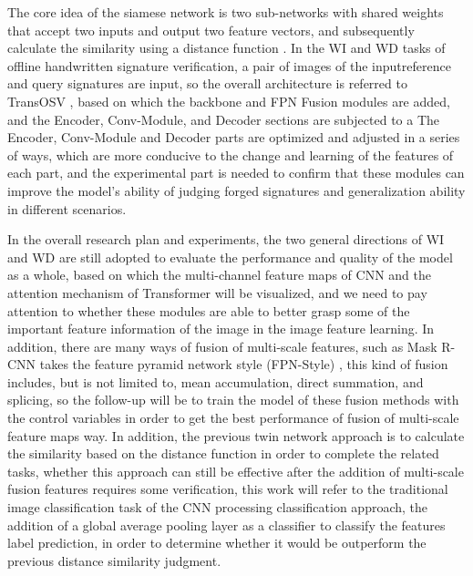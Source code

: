 The core idea of the siamese network is two sub-networks with shared weights that accept two inputs and output two feature vectors, and subsequently calculate the similarity using a distance function \cite{10}. In the WI and WD tasks of offline handwritten signature verification, a pair of images of the inputreference and query signatures are input, so the overall architecture is referred to TransOSV \cite{41}, based on which the backbone and FPN Fusion modules are added, and the Encoder, Conv-Module, and Decoder sections are subjected to a The Encoder, Conv-Module and Decoder parts are optimized and adjusted in a series of ways, which are more conducive to the change and learning of the features of each part, and the experimental part is needed to confirm that these modules can improve the model's ability of judging forged signatures and generalization ability in different scenarios.

In the overall research plan and experiments, the two general directions of WI and WD are still adopted to evaluate the performance and quality of the model as a whole, based on which the multi-channel feature maps of CNN and the attention mechanism of Transformer will be visualized, and we need to pay attention to whether these modules are able to better grasp some of the important feature information of the image in the image feature learning. In addition, there are many ways of fusion of multi-scale features, such as Mask R-CNN \cite{13} takes the feature pyramid network style (FPN-Style) \cite{23}, this kind of fusion includes, but is not limited to, mean accumulation, direct summation, and splicing, so the follow-up will be to train the model of these fusion methods with the control variables in order to get the best performance of fusion of multi-scale feature maps way. In addition, the previous twin network approach is to calculate the similarity based on the distance function in order to complete the related tasks, whether this approach can still be effective after the addition of multi-scale fusion features requires some verification, this work will refer to the traditional image classification task of the CNN processing classification approach, the addition of a global average pooling layer as a classifier to classify the features label prediction, in order to determine whether it would be outperform the previous distance similarity judgment.

